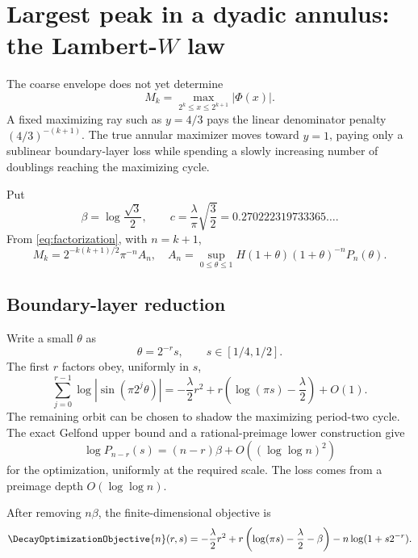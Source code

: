 \documentclass[11pt,oneside]{article}
\theoremstyle{definition}
\theoremstyle{remark}
\begin{document}
\section{Largest peak in a dyadic annulus: the Lambert-\texorpdfstring{\(W\)}{W} law}
\label{sec:annular}

The coarse envelope does not yet determine
\[
 M_k=\max_{2^k\le x\le2^{k+1}}|\Phi(x)|.
\]
A fixed maximizing ray such as \(y=4/3\) pays the linear denominator penalty
\((4/3)^{-(k+1)}\).  The true annular maximizer moves toward \(y=1\), paying
only a sublinear boundary-layer loss while spending a slowly increasing number
of doublings reaching the maximizing cycle.

Put
\begin{equation}
 \beta=\log\frac{\sqrt3}{2},
 \qquad
 c=\frac{\lambda}{\pi}\sqrt{\frac32}
 =0.270222319733365\ldots .
 \label{eq:beta-c}
\end{equation}
From \eqref{eq:factorization}, with \(n=k+1\),
\begin{equation}
 M_k=2^{-k(k+1)/2}\pi^{-n}A_n,
 \quad
 A_n=\sup_{0\le\theta\le1}
 H(1+\theta)(1+\theta)^{-n}P_n(\theta).
 \label{eq:M-A}
\end{equation}

\subsection{Boundary-layer reduction}

Write a small \(\theta\) as
\[
 \theta=2^{-r}s,
 \qquad s\in[1/4,1/2].
\]
The first \(r\) factors obey, uniformly in \(s\),
\begin{equation}
 \sum_{j=0}^{r-1}\log|\sin(\pi2^j\theta)|
 =-\frac\lambda2r^2+r\left(\log(\pi s)-\frac\lambda2\right)+O(1).
 \label{eq:small-block}
\end{equation}
The remaining orbit can be chosen to shadow the maximizing period-two cycle.
The exact Gelfond upper bound and a rational-preimage lower construction give
\begin{equation}
 \log P_{n-r}(s)=(n-r)\beta+O((\log\log n)^2)
 \label{eq:tail-max}
\end{equation}
for the optimization, uniformly at the required scale.  The loss comes from a
preimage depth \(O(\log\log n)\).

After removing \(n\beta\), the finite-dimensional objective is
\begin{equation}
 \DecayOptimizationObjective{n}(r,s)
 =-\frac\lambda2r^2
 +r\left(\log(\pi s)-\frac\lambda2-\beta\right)
 -n\log(1+s2^{-r}).
 \label{eq:F-objective}
\end{equation}
\end{document}
